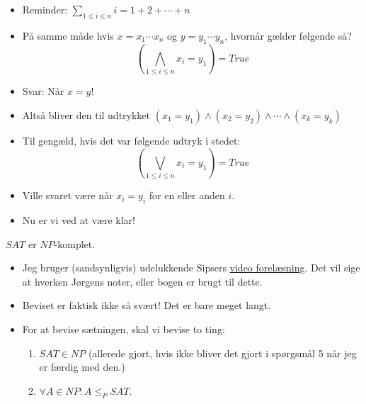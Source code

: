 \begin{frame}[allowframebreaks]
  \begin{itemize}
	\item Reminder: \(\sum_{1 \le i \le n}i = 1 + 2+ \cdots + n\)
	\item På samme måde hvis $x = x_{1} \cdots x_{n}$ og $y = y_{1} \cdots y_{n}$, hvornår gælder følgende så?
		  \begin{equation}
\left( \bigwedge_{1 \le i \le n} x_{i} = y_{1} \right) = True
		  \end{equation}
	\item Svar: Når $x = y$!
	\item Altså bliver den til udtrykket $(x_{1} = y_1) \land (x_{2} = y_2) \land \cdots \land (x_{k} = y_{k})$
	\item Til gengæld, hvis det var følgende udtryk i stedet:
		  \begin{equation}
\left( \bigvee_{1 \le i \le n} x_{i} = y_{1} \right) = True
		  \end{equation}
	\item Ville svaret være når $x_{i} = y_{i}$ for en eller anden $i$.
	\item Nu er vi ved at være klar!
  \end{itemize}

  \begin{theorem}
$SAT$ er $NP$-komplet.
  \end{theorem}
  \begin{itemize}
	\item Jeg bruger (sandsynligvis) udelukkende Sipsers \href{https://youtu.be/6Az1gtDRaAU}{video forelæsning}. Det vil sige at hverken Jørgens noter, eller bogen er brugt til dette.
	\item Beviset er faktisk ikke så svært! Det er bare meget langt.
	\item For at bevise sætningen, skal vi bevise to ting:
		  \begin{enumerate}
			\item $SAT \in NP$ (allerede gjort, hvis ikke bliver det gjort i spørgsmål 5 når jeg er færdig med den.)
			\item $\forall A \in NP : A \le_{P} SAT$.
		  \end{enumerate}


\end{itemize}
\end{frame}
